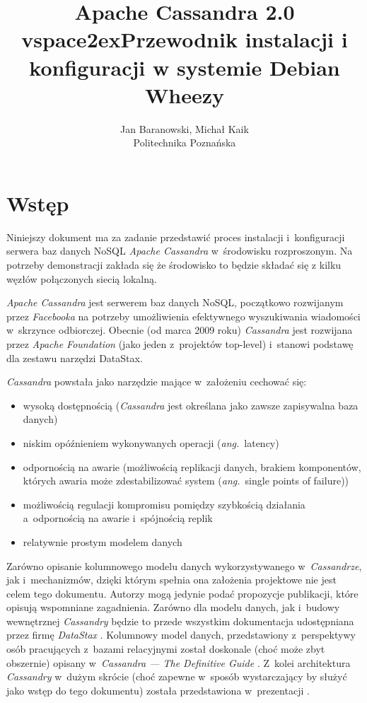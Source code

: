 \documentclass{article} %
\begin{document}

\title{Apache Cassandra 2.0\\vspace{2ex}Przewodnik instalacji i konfiguracji w systemie Debian Wheezy}
\author{Jan Baranowski, Michał Kaik\\Politechnika Poznańska}

\maketitle

\section{Wstęp}\label{sec:intro}

Niniejszy dokument ma za zadanie przedstawić proces instalacji i~konfiguracji serwera baz danych NoSQL \emph{Apache Cassandra} w~środowisku rozproszonym.
Na potrzeby demonstracji zakłada się że środowisko to będzie składać się z kilku węzłów połączonych siecią lokalną.

\emph{Apache Cassandra} jest serwerem baz danych NoSQL, początkowo rozwijanym przez \emph{Facebooka} na potrzeby umożliwienia efektywnego wyszukiwania wiadomości w~skrzynce odbiorczej.
Obecnie (od marca 2009 roku) \emph{Cassandra} jest rozwijana przez \emph{Apache Foundation} (jako jeden z~projektów top-level) i~stanowi podstawę dla zestawu narzędzi DataStax. 

\emph{Cassandra} powstała jako narzędzie mające w~założeniu cechować się:
\begin{itemize}
\item wysoką dostępnością (\emph{Cassandra} jest określana jako zawsze zapisywalna baza danych)
\item niskim opóźnieniem wykonywanych operacji (\textit{ang.}~latency)
\item odpornością na awarie (możliwością replikacji danych, brakiem komponentów, których awaria może zdestabilizować system (\textit{ang.}~single points of failure))
\item możliwością regulacji kompromisu pomiędzy szybkością działania a~odpornością na awarie i~spójnością replik
\item relatywnie prostym modelem danych
\end{itemize}

Zarówno opisanie kolumnowego modelu danych wykorzystywanego w~\emph{Cassandrze}, jak i~mechanizmów, dzięki którym spełnia ona założenia projektowe nie jest celem tego dokumentu.
Autorzy mogą jedynie podać propozycje publikacji, które opisują wspomniane zagadnienia.
Zarówno dla modelu danych, jak i~budowy wewnętrznej \emph{Cassandry} będzie to przede wszystkim dokumentacja udostępniana przez firmę \emph{DataStax} \cite{datastax}.
Kolumnowy model danych, przedstawiony z~perspektywy osób pracujących z~bazami relacyjnymi został doskonale (choć może zbyt obszernie) opisany w~\emph{Cassandra --- The Definitive Guide} \cite{definitiveguide}.
Z~kolei architektura \emph{Cassandry} w~dużym skrócie (choć zapewne w~sposób wystarczający by służyć jako wstęp do tego dokumentu) została przedstawiona w~prezentacji \cite{prezentacja_srds}.
\end{document}
